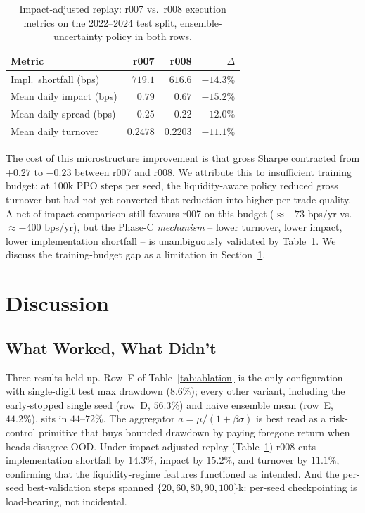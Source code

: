\documentclass[conference]{IEEEtran}
\begin{document}
\begin{table}[t]
  \centering
  \caption{Impact-adjusted replay: r007 vs.\ r008 execution metrics on
  the 2022--2024 test split, ensemble-uncertainty policy in both rows.}
  \label{tab:liquidity}
  \begin{tabular}{lrrr}
    \toprule
    Metric                          & r007 & r008 & $\Delta$ \\
    \midrule
    Impl.\ shortfall (bps)          & $719.1$  & $\mathbf{616.6}$  & $\mathbf{-14.3\%}$ \\
    Mean daily impact (bps)         & $0.79$   & $\mathbf{0.67}$   & $\mathbf{-15.2\%}$ \\
    Mean daily spread (bps)         & $0.25$   & $\mathbf{0.22}$   & $\mathbf{-12.0\%}$ \\
    Mean daily turnover             & $0.2478$ & $\mathbf{0.2203}$ & $\mathbf{-11.1\%}$ \\
    \bottomrule
  \end{tabular}
\end{table}

The cost of this microstructure improvement is that gross Sharpe
contracted from $+0.27$ to $-0.23$ between r007 and r008. We attribute
this to insufficient training budget: at 100k PPO steps per seed, the
liquidity-aware policy reduced gross turnover but had not yet converted
that reduction into higher per-trade quality. A net-of-impact
comparison still favours r007 on this budget ($\approx -73$ bps/yr vs.\
$\approx -400$ bps/yr), but the Phase-C \emph{mechanism} -- lower
turnover, lower impact, lower implementation shortfall -- is
unambiguously validated by Table~\ref{tab:liquidity}. We discuss the
training-budget gap as a limitation in Section~\ref{sec:discussion}.

\section{Discussion}
\label{sec:discussion}

\subsection{What Worked, What Didn't}

Three results held up. Row~F of Table~\ref{tab:ablation} is the only
configuration with single-digit test max drawdown ($8.6\%$); every
other variant, including the early-stopped single seed (row~D,
$56.3\%$) and naive ensemble mean (row~E, $44.2\%$), sits in
$44$--$72\%$. The aggregator $a = \mu/(1+\beta\bar\sigma)$ is best
read as a risk-control primitive that buys bounded drawdown by paying
foregone return when heads disagree OOD. Under impact-adjusted replay
(Table~\ref{tab:liquidity}) r008 cuts implementation shortfall by
$14.3\%$, impact by $15.2\%$, and turnover by $11.1\%$, confirming
that the liquidity-regime features functioned as intended. And the
per-seed best-validation steps spanned $\{20, 60, 80, 90, 100\}$k:
per-seed checkpointing is load-bearing, not incidental.
\end{document}
